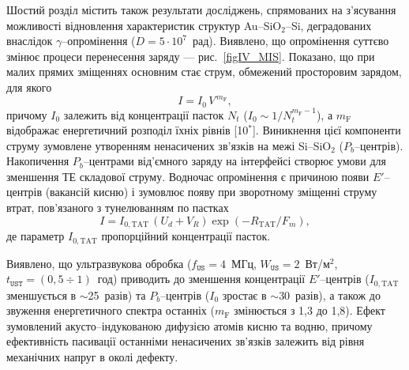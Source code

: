 Шостий розділ містить також результати досліджень, спрямованих на з'ясування можливості відновлення характеристик структур Au--SiO$_2$--Si,
деградованих внаслідок $\gamma$--опромінення ($D=5\cdot10^7$~рад).
Виявлено, що опромінення суттєво змінює процеси перенесення заряду --- рис.~\ref{figIV_MIS}.
Показано, що при малих прямих зміщеннях основним стає струм, обмежений просторовим зарядом, для якого
\begin{equation}\label{eqVIsclc}
  I=I_0\,V^{\,m_\mathrm{F}},
\end{equation}
причому $I_0$ залежить від концентрації пасток $N_t$ ($I_0\sim 1/N_t^{m_\mathrm{F}-1}$),
а $m_\mathrm{F}$ відображає енергетичний розподіл їхніх рівнів
[10$^*$].
Виникнення цієї компоненти струму зумовлене утворенням ненасичених зв'язків на межі Si--SiO$_2$ ($P_b$--центрів).
Накопичення $P_b$--центрами від'ємного заряду на інтерфейсі створює умови для зменшення ТЕ складової струму.
Водночас опромінення є причиною появи $E'$--центрів (вакансій кисню) і зумовлює появу при зворотному зміщенні струму втрат, пов'язаного з тунелюванням по пастках
\begin{equation}\label{eqIVTAT}
  I=I_{0,\mathrm{TAT}}\,(U_d+V_R)\exp\left(-R_\mathrm{TAT}/F_m\right),
\end{equation}
де параметр $I_{0,\mathrm{TAT}}$ пропорційний концентрації пасток.

Виявлено, що
ультразвукова обробка
($f_\mathtt{US}=4$~МГц, $W_\mathtt{US}=2$~Вт/м$^2$, $t_\mathtt{UST}=(0,5\div1)$~год) приводить до зменшення концентрації
$E'$--центрів ($I_{0,\mathrm{TAT}}$ зменшується в $\sim$25~разів) та  $P_b$--центрів ($I_0$ зростає в $\sim$30~разів),
а також до звуження енергетичного спектра останніх ($m_\mathrm{F}$ змінюється з 1,3 до 1,8).
Ефект зумовлений акусто--індукованою дифузією  атомів кисню та водню, причому ефективність пасивації останніми ненасичених зв'язків залежить
від рівня механічних напруг в околі дефекту.



